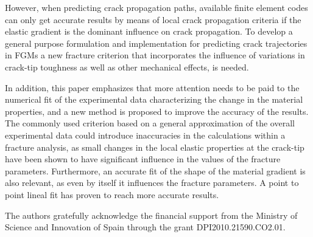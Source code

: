 However, when predicting crack propagation paths, available finite element codes can only get accurate results by means of local crack propagation criteria if the elastic gradient is the dominant influence on crack propagation. To develop a general purpose formulation and implementation for predicting crack trajectories in FGMs a new fracture criterion that incorporates the influence of variations in crack-tip toughness as well as other mechanical effects, is needed.

In addition, this paper emphasizes that more attention needs to be paid to the numerical fit of the experimental data characterizing the change in the material properties, and a new method is proposed to improve the accuracy of the results. The commonly used criterion based on a general approximation of the overall experimental data could introduce inaccuracies in the calculations within a fracture analysis, as small changes in the local elastic properties at the crack-tip have been shown to have significant influence in the values of the fracture parameters. Furthermore, an accurate fit of the shape of the material gradient is also relevant, as even by itself it influences the fracture parameters. A point to point lineal fit has proven to reach more accurate results.

\begin{acknowledgements}
The authors gratefully acknowledge the financial support from the Ministry of Science and Innovation of Spain through the grant DPI2010.21590.CO2.01.
\end{acknowledgements}

